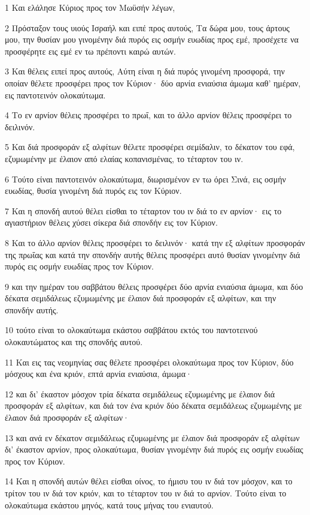 \par 1 Και ελάλησε Κύριος προς τον Μωϋσήν λέγων,
\par 2 Πρόσταξον τους υιούς Ισραήλ και ειπέ προς αυτούς, Τα δώρα μου, τους άρτους μου, την θυσίαν μου γινομένην διά πυρός εις οσμήν ευωδίας προς εμέ, προσέχετε να προσφέρητε εις εμέ εν τω πρέποντι καιρώ αυτών.
\par 3 Και θέλεις ειπεί προς αυτούς, Αύτη είναι η διά πυρός γινομένη προσφορά, την οποίαν θέλετε προσφέρει προς τον Κύριον· δύο αρνία ενιαύσια άμωμα καθ' ημέραν, εις παντοτεινόν ολοκαύτωμα.
\par 4 Το εν αρνίον θέλεις προσφέρει το πρωΐ, και το άλλο αρνίον θέλεις προσφέρει το δειλινόν.
\par 5 Και διά προσφοράν εξ αλφίτων θέλετε προσφέρει σεμίδαλιν, το δέκατον του εφά, εζυμωμένην με έλαιον από ελαίας κοπανισμένας, το τέταρτον του ιν.
\par 6 Τούτο είναι παντοτεινόν ολοκαύτωμα, διωρισμένον εν τω όρει Σινά, εις οσμήν ευωδίας, θυσία γινομένη διά πυρός εις τον Κύριον.
\par 7 Και η σπονδή αυτού θέλει είσθαι το τέταρτον του ιν διά το εν αρνίον· εις το αγιαστήριον θέλεις χύσει σίκερα διά σπονδήν εις τον Κύριον.
\par 8 Και το άλλο αρνίον θέλεις προσφέρει το δειλινόν· κατά την εξ αλφίτων προσφοράν της πρωΐας και κατά την σπονδήν αυτής θέλεις προσφέρει αυτό θυσίαν γινομένην διά πυρός εις οσμήν ευωδίας προς τον Κύριον.
\par 9 και την ημέραν του σαββάτου θέλεις προσφέρει δύο αρνία ενιαύσια άμωμα, και δύο δέκατα σεμιδάλεως εζυμωμένης με έλαιον διά προσφοράν εξ αλφίτων, και την σπονδήν αυτής.
\par 10 τούτο είναι το ολοκαύτωμα εκάστου σαββάτου εκτός του παντοτεινού ολοκαυτώματος και της σπονδής αυτού.
\par 11 Και εις τας νεομηνίας σας θέλετε προσφέρει ολοκαύτωμα προς τον Κύριον, δύο μόσχους και ένα κριόν, επτά αρνία ενιαύσια, άμωμα·
\par 12 και δι' έκαστον μόσχον τρία δέκατα σεμιδάλεως εζυμωμένης με έλαιον διά προσφοράν εξ αλφίτων, και διά τον ένα κριόν δύο δέκατα σεμιδάλεως εζυμωμένης με έλαιον διά προσφοράν εξ αλφίτων·
\par 13 και ανά εν δέκατον σεμιδάλεως εζυμωμένης με έλαιον διά προσφοράν εξ αλφίτων δι' έκαστον αρνίον, προς ολοκαύτωμα, θυσίαν γινομένην διά πυρός εις οσμήν ευωδίας προς τον Κύριον.
\par 14 Και η σπονδή αυτών θέλει είσθαι οίνος, το ήμισυ του ιν διά τον μόσχον, και το τρίτον του ιν διά τον κριόν, και το τέταρτον του ιν διά το αρνίον. Τούτο είναι το ολοκαύτωμα εκάστου μηνός, κατά τους μήνας του ενιαυτού.
